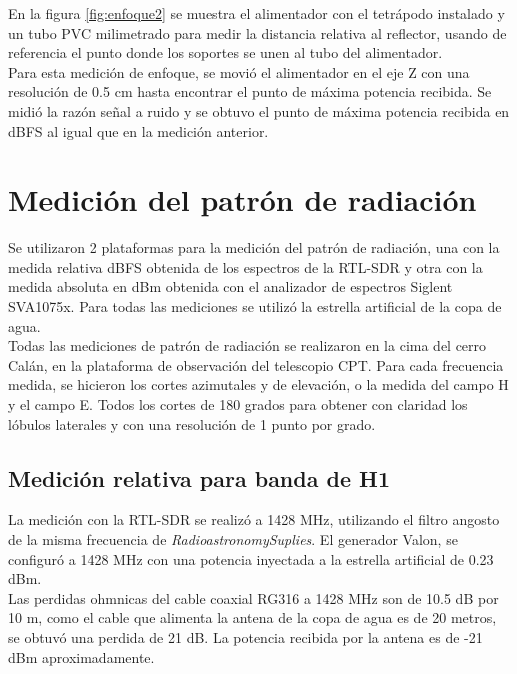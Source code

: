 En la figura \ref{fig:enfoque2} se muestra el alimentador con el tetrápodo instalado y un tubo PVC milimetrado para medir la distancia relativa al reflector, usando de referencia el punto donde los soportes se unen al tubo del alimentador.\\

Para esta medición de enfoque, se movió el alimentador en el eje Z con una resolución de 0.5 cm hasta encontrar el punto de máxima potencia recibida. Se midió la razón señal a ruido y se obtuvo el punto de máxima potencia recibida en dBFS al igual que en la medición anterior.\\

\section{Medición del patrón de radiación}

Se utilizaron 2 plataformas para la medición del patrón de radiación, una con la medida relativa dBFS obtenida de los espectros de la RTL-SDR y otra con la medida absoluta en dBm obtenida con el analizador de espectros Siglent SVA1075x. Para todas las mediciones se utilizó la estrella artificial de la copa de agua.\\

Todas las mediciones de patrón de radiación se realizaron en la cima del cerro Calán, en la plataforma de observación del telescopio CPT. Para cada frecuencia medida, se hicieron los cortes azimutales y de elevación, o la medida del campo H y el campo E. Todos los cortes de 180 grados para obtener con claridad los lóbulos laterales y con una resolución de 1 punto por grado.\\


\subsection{Medición relativa para banda de H1}

La medición con la RTL-SDR se realizó a 1428 MHz, utilizando el filtro angosto de la misma frecuencia de \textit{RadioastronomySuplies}. El generador Valon, se configuró a 1428 MHz con una potencia inyectada a la estrella artificial de 0.23 dBm.\\

Las perdidas ohmnicas del cable coaxial RG316 a 1428 MHz son de 10.5 dB por 10 m, como el cable que alimenta la antena de la copa de agua es de 20 metros, se obtuvó una perdida de 21 dB. La potencia recibida por la antena es de -21 dBm aproximadamente.\\

